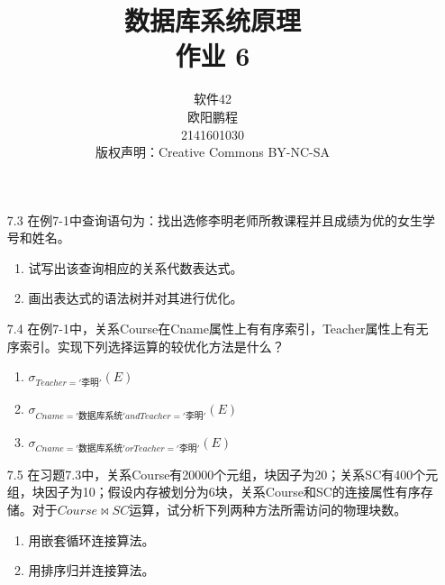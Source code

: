 \documentclass[]{ctexart}
\title{数据库系统原理 \\ 作业 6}
\author{软件42 \\ 欧阳鹏程 \\ 2141601030 \\ 版权声明：Creative Commons BY-NC-SA}
\begin{document}
\maketitle

\begin{enumerate}
	\item[7.3] 在例7-1中查询语句为：找出选修李明老师所教课程并且成绩为优的女生学号和姓名。
	\begin{enumerate}
		\item 试写出该查询相应的关系代数表达式。
		\item 画出表达式的语法树并对其进行优化。
	\end{enumerate}
	

	\item[7.4] 在例7-1中，关系Course在Cname属性上有有序索引，Teacher属性上有无序索引。实现下列选择运算的较优化方法是什么？
	\begin{enumerate}
		\item $\sigma_{Teacher='\text{李明}'}(E)$
		\item $\sigma_{Cname='\text{数据库系统}' and Teacher='\text{李明}'}(E)$
		\item $\sigma_{Cname='\text{数据库系统}' or Teacher='\text{李明}'}(E)$
	\end{enumerate}
	

	\item[7.5] 在习题7.3中，关系Course有20000个元组，块因子为20；关系SC有400个元组，块因子为10；假设内存被划分为6块，关系Course和SC的连接属性有序存储。对于$Course \bowtie SC$运算，试分析下列两种方法所需访问的物理块数。
	\begin{enumerate}
		\item 用嵌套循环连接算法。
		\item 用排序归并连接算法。
	\end{enumerate}
	
\end{enumerate}
\end{document}

